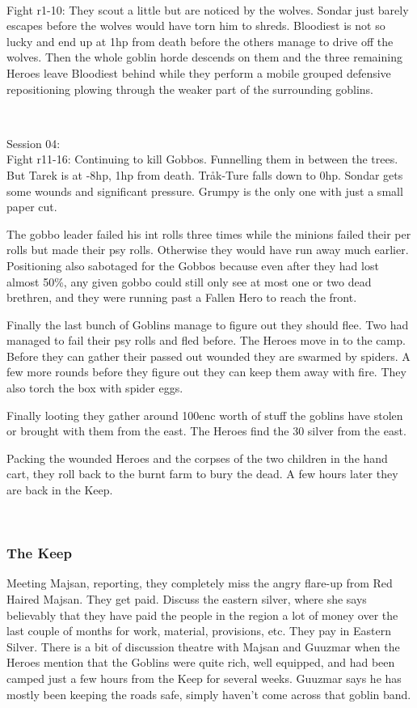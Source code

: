 \

Fight r1-10: They scout a little but are noticed by the wolves. Sondar just barely escapes before the wolves would have torn him to shreds. Bloodiest is not so lucky and end up at 1hp from death before the others manage to drive off the wolves. Then the whole goblin horde descends on them and the three remaining Heroes leave Bloodiest behind while they perform a mobile grouped defensive repositioning plowing through the weaker part of the surrounding goblins.

\

Session 04:\\                                                           %
Fight r11-16: Continuing to kill Gobbos. Funnelling them in between the trees. But Tarek is at -8hp, 1hp from death. Tråk-Ture falls down to 0hp. Sondar gets some wounds and significant pressure. Grumpy is the only one with just a small paper cut.

\begin{readoutloud}
The gobbo leader failed his int rolls three times while the minions failed their per rolls but made their psy rolls. Otherwise they would have run away much earlier. Positioning also sabotaged for the Gobbos because even after they had lost almost 50\%, any given gobbo could still only see at most one or two dead brethren, and they were running past a Fallen Hero to reach the front.
\end{readoutloud}

Finally the last bunch of Goblins manage to figure out they should flee. Two had managed to fail their psy rolls and fled before. The Heroes move in to the camp. Before they can gather their passed out wounded they are swarmed by spiders. A few more rounds before they figure out they can keep them away with fire. They also torch the box with spider eggs.

Finally looting they gather around 100enc worth of stuff the goblins have stolen or brought with them from the east. The Heroes find the 30 silver from the east.

Packing the wounded Heroes and the corpses of the two children in the hand cart, they roll back to the burnt farm to bury the dead. A few hours later they are back in the Keep.

\

\subsubsection*{The Keep}
Meeting Majsan, reporting, they completely miss the angry flare-up from Red Haired Majsan. They get paid. Discuss the eastern silver, where she says believably that they have paid the people in the region a lot of money over the last couple of months for work, material, provisions, etc. They pay in Eastern Silver. There is a bit of discussion theatre with Majsan and Guuzmar when the Heroes mention that the Goblins were quite rich, well equipped, and had been camped just a few hours from the Keep for several weeks. Guuzmar says he has mostly been keeping the roads safe, simply haven't come across that goblin band.

